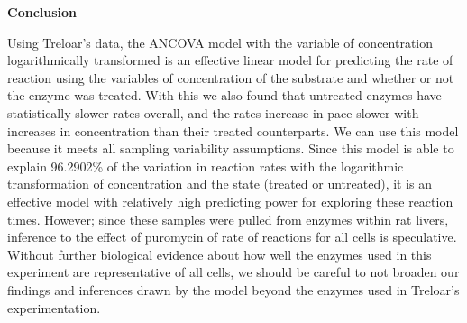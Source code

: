 \documentclass[
]{article}
\begin{document}
\textbf{Conclusion}

Using Treloar's data, the ANCOVA model with the variable of
concentration logarithmically transformed is an effective linear model
for predicting the rate of reaction using the variables of concentration
of the substrate and whether or not the enzyme was treated. With this we
also found that untreated enzymes have statistically slower rates
overall, and the rates increase in pace slower with increases in
concentration than their treated counterparts. We can use this model
because it meets all sampling variability assumptions. Since this model
is able to explain 96.2902\% of the variation in reaction rates with the
logarithmic transformation of concentration and the state (treated or
untreated), it is an effective model with relatively high predicting
power for exploring these reaction times. However; since these samples
were pulled from enzymes within rat livers, inference to the effect of
puromycin of rate of reactions for all cells is speculative. Without
further biological evidence about how well the enzymes used in this
experiment are representative of all cells, we should be careful to not
broaden our findings and inferences drawn by the model beyond the
enzymes used in Treloar's experimentation.
\end{document}
